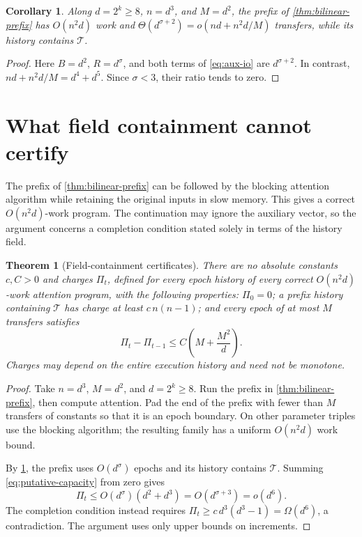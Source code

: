 \documentclass[11pt]{article}
\newtheorem{theorem}{Theorem}[section]
\newtheorem{corollary}[corollary]{Corollary}
\theoremstyle{definition}
\theoremstyle{remark}
\newcommand{\cT}{\mathcal T}
\begin{document}
\begin{corollary}
\label{cor:subintermediate}
Along $d=2^k\ge8$, $n=d^3$, and $M=d^2$, the prefix of
\cref{thm:bilinear-prefix} has $O(n^2d)$ work and
$\Theta(d^{\sigma+2})=o(nd+n^2d/M)$ transfers, while its history
contains $\cT$.
\end{corollary}
\begin{proof}
Here $B=d^2$, $R=d^\sigma$, and both terms of \cref{eq:aux-io}
are $d^{\sigma+2}$. In contrast, $nd+n^2d/M=d^4+d^5$.
Since $\sigma<3$, their ratio tends to zero.
\end{proof}

\section{What field containment cannot certify}
\label{sec:certificates}
The prefix of \cref{thm:bilinear-prefix} can be followed by the blocking
attention algorithm while retaining the original inputs in slow
memory. This gives a correct $O(n^2d)$-work program. The continuation
may ignore the auxiliary vector, so the argument concerns a completion
condition stated solely in terms of the history field.

\begin{theorem}[Field-containment certificates]
\label{thm:certificate}
There are no absolute constants $c,C>0$ and charges $\Pi_t$, defined
for every epoch history of every correct $O(n^2d)$-work attention
program, with the following properties: $\Pi_0=0$; a prefix history
containing $\cT$ has charge at least $c\,n(n-1)$; and every epoch
of at most $M$ transfers satisfies
\begin{equation}
 \Pi_t-\Pi_{t-1}\le C\left(M+\frac{M^2}{d}\right).
 \label{eq:putative-capacity}
\end{equation}
Charges may depend on the entire execution history and need not be
monotone.
\end{theorem}
\begin{proof}
Take $n=d^3$, $M=d^2$, and $d=2^k\ge8$. Run the prefix in
\cref{thm:bilinear-prefix}, then compute attention. Pad the end of
the prefix with fewer than $M$ transfers of constants so that it is
an epoch boundary. On other parameter triples use the blocking
algorithm; the resulting family has a uniform $O(n^2d)$ work bound.

By \cref{cor:subintermediate}, the prefix uses $O(d^\sigma)$ epochs
and its history contains $\cT$. Summing \cref{eq:putative-capacity}
from zero gives
\[
 \Pi_t\le O(d^\sigma)(d^2+d^3)
       =O(d^{\sigma+3})=o(d^6).
\]
The completion condition instead requires
$\Pi_t\ge c\,d^3(d^3-1)=\Omega(d^6)$, a contradiction.
The argument uses only upper bounds on increments.
\end{proof}
\end{document}
